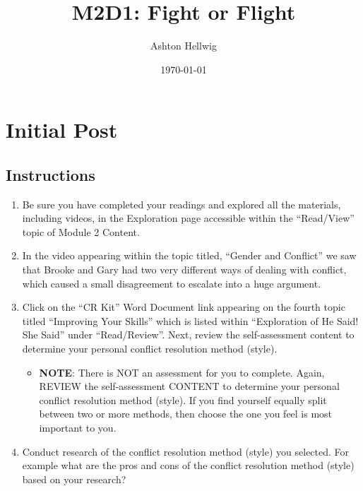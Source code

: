 \documentclass[stu,12pt]{apa7}
\title{%
    M2D1: Fight or Flight
  }
\author{Ashton Hellwig}
\date{\today}
\begin{document}
  \maketitle

  \section{Initial Post}
    \subsection*{Instructions}
      \begin{enumerate}
        \item Be sure you have completed your readings and explored all the
          materials, including videos, in the Exploration page accessible within
          the ``Read/View'' topic of Module 2 Content.
        \item In the video appearing within the topic titled, ``Gender and
          Conflict'' we saw that Brooke and Gary had two very different ways of
          dealing with conflict, which caused a small disagreement to escalate
          into a huge argument.
        \item Click on the ``CR Kit'' Word Document link appearing on the fourth
          topic titled ``Improving Your Skills'' which is listed within
          ``Exploration of He Said! She Said'' under ``Read/Review''. Next,
          review the self-assessment content to determine your personal conflict
          resolution method (style).
          \begin{itemize}
            \item \textbf{NOTE}: There is NOT an assessment for you to complete.
              Again, REVIEW the self-assessment CONTENT to determine your
              personal conflict resolution method (style). If you find yourself
              equally split between two or more methods, then choose the one you
              feel is most important to you.
          \end{itemize}
        \item Conduct research of the conflict resolution method (style) you
          selected. For example what are the pros and cons of the conflict
          resolution method (style) based on your research?
      \end{enumerate}


      \newpage
\end{document}
